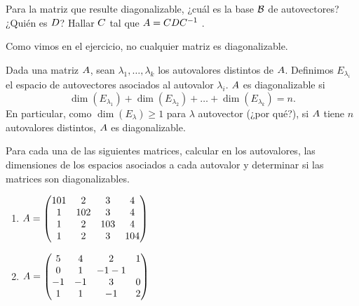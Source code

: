 Para la matriz que resulte diagonalizable, ¿cuál es la base $\mathcal B$ de
autovectores? ¿Quién es $\Db$? Hallar $\Cb$ tal que $\Ab = \Cb \Db \Cb^{-1}$ .

%
%
%
%
%
%
%
%
%
%

Como vimos en el ejercicio, no cualquier matriz es diagonalizable.

Dada una matriz $\Ab$, sean $\lambda_1, \dots, \lambda_k$ los autovalores
distintos de $\Ab$. Definimos $E_{\lambda_i}$ el espacio de autovectores
asociados al autovalor $\lambda_i$. $\Ab$ es diagonalizable si
$$
\dim(E_{\lambda_1}) + \dim(E_{\lambda_2}) + \dots +\dim(E_{\lambda_k}) = n.
$$
En particular, como $\dim(E_\lambda) \ge 1$ para $\lambda$ autovector
(¿por qué?), si $\Ab$ tiene $n$ autovalores distintos, $\Ab$ es
diagonalizable.

\begin{ejercicio}
Para cada una de las siguientes matrices, calcular en \python los
autovalores, las dimensiones de los espacios asociados a cada autovalor
y determinar si las matrices son diagonalizables.

\begin{enumerate}
\item   $\Ab = \begin{pmatrix} 101 & 2 & 3 & 4 \\ 1 & 102 & 3 & 4 \\ 1 & 2 & 103 & 4 \\ 1 & 2 & 3 & 104 \end{pmatrix}$
\item   $\Ab = \begin{pmatrix} 5 & 4 & 2 & 1 \\ 0 & 1 & -1 -1 \\ -1 &-1 &3 & 0 \\ 1 & 1 & -1 & 2 \end{pmatrix}$
\end{enumerate}


\end{ejercicio}

